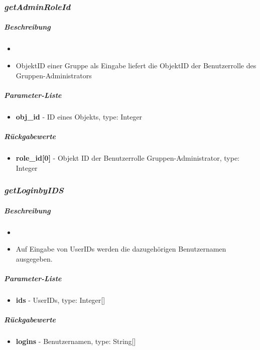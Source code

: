 \subsubsection*{\textit{getAdminRoleId}}\label{getAdminRoleIdGDGUI}
\subparagraph{Beschreibung}
\begin{itemize}
	\item[]  \noindent{} 
	\item[] ObjektID einer Gruppe als Eingabe liefert die ObjektID der Benutzerrolle des Gruppen-Administrators
\end{itemize}
\subparagraph{Parameter-Liste}
\begin{itemize}
	\item[] \textbf{obj\_id} - ID eines Objekts, type: Integer
\end{itemize}
\subparagraph{Rückgabewerte}
\begin{itemize}
	\item[] \textbf{role\_id[0]} - Objekt ID der Benutzerrolle Gruppen-Administrator, type: Integer
\end{itemize}

\subsubsection*{\textit{getLoginbyIDS}}\label{getLoginbyIDSGDGUI}
\subparagraph{Beschreibung}
\begin{itemize}
	\item[]  \noindent{} 
	\item[] Auf Eingabe von UserIDs werden die dazugehörigen Benutzernamen ausgegeben.
\end{itemize}
\subparagraph{Parameter-Liste}
\begin{itemize}
	\item[] \textbf{ids} - UserIDs, type: Integer[]
\end{itemize}
\subparagraph{Rückgabewerte}
\begin{itemize}
	\item[] \textbf{logins} - Benutzernamen, type: String[]
\end{itemize}

